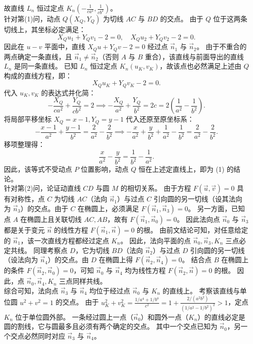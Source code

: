 \begin{solution}
故直线 $L_n$ 恒过定点 $K_n\left(-\frac{1}{c a^2}, \frac{1}{c b^2}\right)$。\\
针对第(1)问，动点 $Q(X_Q, Y_Q)$ 为切线 $AC$ 与 $BD$ 的交点。
由于 $Q$ 位于这两条切线上，其坐标必定满足：
\[ X_Q u_1 + Y_Q v_1 - 2 = 0, \quad X_Q u_2 + Y_Q v_2 - 2 = 0. \]
因此在 $u-v$ 平面中，直线 $X_Q u + Y_Q v - 2 = 0$ 经过点 $\vec{n}_1$ 与 $\vec{n}_2$。
由于不重合的两点确定一条直线，且 $\vec{n}_1 \neq \vec{n}_2$（否则 $A$ 与 $B$ 重合），该直线与前面导出的直线 $L_n$ 是同一条直线。
已知 $L_n$ 恒过定点 $K_n(u_K, v_K)$，故该点也必然满足上述由 $Q$ 构成的直线方程，即：
\[ X_Q u_K + Y_Q v_K - 2 = 0. \]
代入 $u_K, v_K$ 的表达式并化简：
\[ -\frac{X_Q}{c a^2} + \frac{Y_Q}{c b^2} = 2 \implies -\frac{X_Q}{a^2} + \frac{Y_Q}{b^2} = 2c = 2\left(\frac{1}{a^2} - \frac{1}{b^2}\right). \]
将局部平移坐标 $X_Q = x - 1, Y_Q = y - 1$ 代入还原至原坐标系：
\[ -\frac{x-1}{a^2} + \frac{y-1}{b^2} = \frac{2}{a^2} - \frac{2}{b^2} \implies -\frac{x}{a^2} + \frac{y}{b^2} + \frac{1}{a^2} - \frac{1}{b^2} = \frac{2}{a^2} - \frac{2}{b^2}. \]
移项整理得：
\[ \frac{x}{a^2} - \frac{y}{b^2} = \frac{1}{b^2} - \frac{1}{a^2}. \]
因此，该等式不受动点 $P$ 位置影响，动点 $Q$ 恒在上述定直线上，即为 (1) 的结论。\\
针对第(2)问，论证动直线 $CD$ 与圆 $M$ 的相切关系。
由于方程 $F(\vec{u}, \vec{v}) = 0$ 具有对称性，点 $C$ 为切线 $AC$（法向 $\vec{n}_1$）与过点 $C$ 引向圆的另一切线（设其法向为 $\vec{n}_3$）的交点。由于 $C$ 在椭圆上，必须满足 $F(\vec{n}_1, \vec{n}_3) = 0$。
另一方面，已知点 $A$ 在椭圆上且关联切线 $AC, AB$，故有 $F(\vec{n}_1, \vec{n}_0) = 0$。
因此法向点 $\vec{n}_0$ 与 $\vec{n}_3$ 都是关于变元 $\vec{n}$ 的线性方程 $F(\vec{n}_1, \vec{n}) = 0$ 的根。
由前文结论可知，对任意给定的 $\vec{n}_1$，该一次直线方程都经过定点 $K_n$。
因此，法向平面的点 $\vec{n}_0, \vec{n}_3, K_n$ 三点必定共线。
同理考察点 $D$，它为切线 $BD$（法向 $\vec{n}_2$）与过点 $D$ 引向圆的另一切线（设法向为 $\vec{n}_4$）的交点。由 $D$ 在椭圆上得 $F(\vec{n}_2, \vec{n}_4) = 0$。
结合点 $B$ 在椭圆上的条件 $F(\vec{n}_2, \vec{n}_0) = 0$，可知 $\vec{n}_0$ 与 $\vec{n}_4$ 均为线性方程 $F(\vec{n}_2, \vec{n}) = 0$ 的根。
因此，点 $\vec{n}_0, \vec{n}_4, K_n$ 三点同样共线。\\
综合可知，法向点 $\vec{n}_3$ 与 $\vec{n}_4$ 均位于经过点 $\vec{n}_0$ 与 $K_n$ 的直线上。
考察该直线与单位圆 $u^2 + v^2 = 1$ 的交点。
由于 $u_K^2 + v_K^2 = \frac{1/a^4 + 1/b^4}{c^2} = 1 + \frac{2/(a^2 b^2)}{(1/a^2 - 1/b^2)^2} > 1$，定点 $K_n$ 位于单位圆外部。
一条经过圆上一点（$\vec{n}_0$）和圆外一点（$K_n$）的直线必定是圆的割线，它与圆最多且必须有两个确定的交点。
其中一个交点已知为 $\vec{n}_0$，另一个交点必然同时对应 $\vec{n}_3$ 与 $\vec{n}_4$。

\end{solution}
